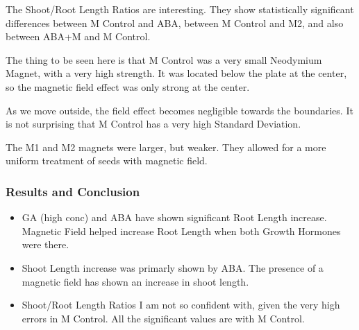\documentclass[twocolumn]{article}
\begin{document}
The Shoot/Root Length Ratios are interesting. They show statistically significant differences between M Control and ABA, between M Control and M2, and also between ABA+M and M Control. 

The thing to be seen here is that M Control was a very small Neodymium Magnet, with a very high strength. It was located below the plate at the center, so the magnetic field effect was only strong at the center. 

As we move outside, the field effect becomes negligible towards the boundaries. It is not surprising that M Control has a very high Standard Deviation. 

The M1 and M2 magnets were larger, but weaker. They allowed for a more uniform treatment of seeds with magnetic field.


\subsubsection{Results and Conclusion}

\begin{itemize}
    \item GA (high conc) and ABA have shown significant Root Length increase. Magnetic Field helped increase Root Length when both Growth Hormones were there.
    \item Shoot Length increase was primarly shown by ABA. The presence of a magnetic field has shown an increase in shoot length. 
    \item Shoot/Root Length Ratios I am not so confident with, given the very high errors in M Control. All the significant values are with M Control. 
\end{itemize}
\end{document}
